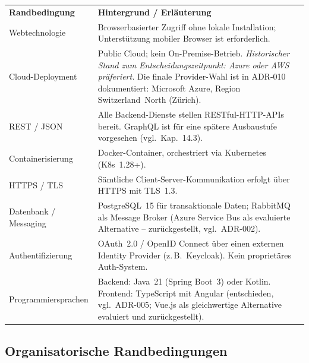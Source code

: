 \begin{tabularx}{\textwidth}{L{3.2cm} X}
  \color{white}\textbf{Randbedingung} &
  \color{white}\textbf{Hintergrund / Erläuterung} \\

  Webtechnologie &
  Browserbasierter Zugriff ohne lokale Installation;
  Unterstützung mobiler Browser ist erforderlich. \\

  Cloud-Deployment &
  Public Cloud; kein On-Premise-Betrieb.
  \textit{Historischer Stand zum Entscheidungszeitpunkt: Azure oder AWS präferiert.}
  Die finale Provider-Wahl ist in ADR-010 dokumentiert:
  Microsoft Azure, Region Switzerland~North (Zürich). \\

  REST / JSON &
  Alle Backend-Dienste stellen RESTful-HTTP-APIs bereit.
  GraphQL ist für eine spätere Ausbaustufe vorgesehen
  (vgl.\ Kap.~14.3). \\

  Containerisierung &
  Docker-Container, orchestriert via Kubernetes
  (K8s~1.28+). \\

  HTTPS / TLS &
  Sämtliche Client-Server-Kommunikation erfolgt über HTTPS
  mit TLS~1.3. \\

  Datenbank / Messaging &
  PostgreSQL~15 für transaktionale Daten;
  RabbitMQ als Message Broker (Azure Service Bus als evaluierte Alternative --
  zurückgestellt, vgl.\ ADR-002). \\

  Authentifizierung &
  OAuth~2.0 / OpenID Connect über einen externen Identity
  Provider (z.\,B.\ Keycloak). Kein proprietäres
  Auth-System. \\

  Programmiersprachen &
  Backend: Java~21 (Spring Boot~3) oder Kotlin.\newline
  Frontend: TypeScript mit Angular (entschieden, vgl.\ ADR-005;
  Vue.js als gleichwertige Alternative evaluiert und zurückgestellt). \\
\end{tabularx}

\subsection{Organisatorische Randbedingungen}
\label{sec:randbedingungen-organisatorisch}

